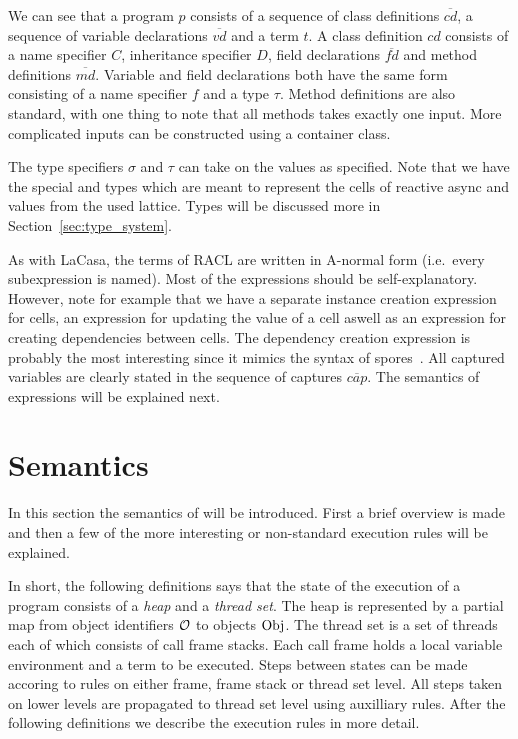 We can see that a program $p$ consists of a sequence of class definitions
$\overline{cd}$, a sequence of variable declarations $\overline{vd}$ and a term
$t$. A class definition $cd$ consists of a name specifier $C$, inheritance
specifier $D$, field declarations $\overline{fd}$ and method definitions
$\overline{md}$. Variable and field declarations both have the same form
consisting of a name specifier $f$ and a type $\tau$. Method definitions are
also standard, with one thing to note that all methods takes exactly one input.
More complicated inputs can be constructed using a container class.

The type specifiers $\sigma$ and $\tau$ can take on the values as specified.
Note that we have the special \CellType{} and \LatType{} types which are meant
to represent the cells of reactive async and values from the used lattice. Types
will be discussed more in Section~\ref{sec:type_system}.

As with LaCasa, the terms of RACL are written in A-normal form (i.e.\ every
subexpression is named). Most of the expressions should be self-explanatory.
However, note for example that we have a separate instance creation expression
for cells, an expression for updating the value of a cell aswell as an
expression for creating dependencies between cells. The dependency creation
expression is probably the most interesting since it mimics the syntax of
spores~\parencite{conf/ecoop/MillerHO14}. All captured variables are clearly
stated in the sequence of captures $\overline{cap}$. The semantics of 
expressions will be explained next.

\section{Semantics}%
\label{sec:semantics}

In this section the semantics of \RACL{} will be introduced. First a brief
overview is made and then a few of the more interesting or non-standard
execution rules will be explained.

In short, the following definitions says that the state of the execution of a
\RACL{} program consists of a \emph{heap} and a \emph{thread set}. The heap is
represented by a partial map from object identifiers $\mathcal{O}$ to objects
$\mathrm{Obj}$. The thread set is a set of threads each of which consists of call
frame stacks. Each call frame holds a local variable environment and a term to
be executed. Steps between states can be made accoring to rules on either frame,
frame stack or thread set level. All steps taken on lower levels are propagated
to thread set level using auxilliary rules. After the following definitions we
describe the execution rules in more detail.

